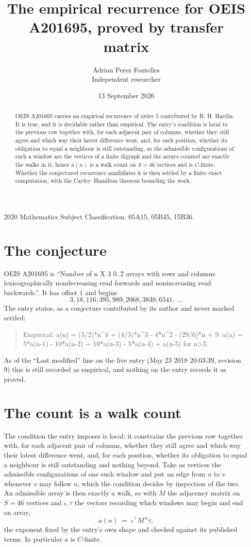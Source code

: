 \documentclass[11pt,a4paper]{article}
\title{The empirical recurrence for OEIS A201695, proved by transfer matrix}
\author{Adrian Perez Fontelles\\ \small Independent researcher}
\date{13 September 2026}
\theoremstyle{plain}
\theoremstyle{definition}
\begin{document}
\maketitle

\begin{abstract}
OEIS A201695 carries an empirical recurrence of order $5$ contributed by R. H. Hardin. It is
true, and it is decidable rather than empirical. The entry's condition is local to the previous row together with, for each adjacent pair of columns, whether they still agree and which way their latest difference went, and, for each position, whether its obligation to equal a neighbour is still outstanding, so
the admissible configurations of such a window are the vertices of a finite digraph and the
arrays counted are exactly the walks in it; hence $a(n)$ is a walk count on $S=46$ vertices
and is $C$-finite. Whether the conjectured recurrence annihilates it is then settled by a
finite exact computation, with the Cayley--Hamilton theorem bounding the work.
\end{abstract}

\noindent\small 2020 Mathematics Subject Classification. 05A15, 05B45, 15B36.\normalsize

\section{The conjecture}

OEIS A201695 is ``Number of n X 3 0..2 arrays with rows and columns lexicographically nondecreasing read forwards and nonincreasing read backwards.''. It has offset $1$ and begins
\[
3, 18, 116, 395, 989, 2068, 3838, 6541,\ \dots
\]
The entry states, as a conjecture contributed by its author and never marked settled:
\begin{quote}
Empirical: a(n) = (3/2)*n\^{}4 + (4/3)*n\^{}3 - 4*n\^{}2 - (29/6)*n + 9. a(n) = 5*a(n-1) - 10*a(n-2) + 10*a(n-3) - 5*a(n-4) + a(n-5) for n>5.
\end{quote}
As of the ``Last modified'' line on the live entry (May 23 2018 20:03:39, revision 9) this is still
recorded as empirical, and nothing on the entry records it as proved.

\section{The count is a walk count}

The condition the entry imposes is local: it constrains the previous row together with, for each adjacent pair of columns, whether they still agree and which way their latest difference went, and, for each position, whether its obligation to equal a neighbour is still outstanding and nothing beyond. Take as
vertices the admissible configurations of one such window and put an edge from $u$ to $v$
whenever $v$ may follow $u$, which the condition decides by inspection of the two. An
admissible array is then exactly a walk, so with $M$ the adjacency matrix on $S=46$ vertices
and $\iota,\tau$ the vectors recording which windows may begin and end an array,
\[
a(n)\;=\;\iota^{\!\top}M^{\,n}\tau ,
\]
the exponent fixed by the entry's own shape and checked against its published terms. In
particular $a$ is $C$-finite.
\end{document}
